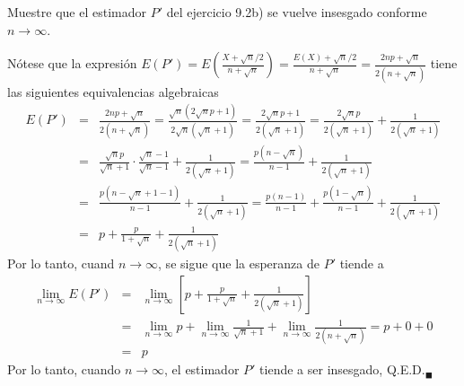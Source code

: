 \begin{enunciado}
 Muestre que el estimador $P'$ del ejercicio 9.2b) se vuelve insesgado conforme $n \rightarrow \infty$.
\end{enunciado}

\begin{solucion}
 N\'otese que la expresi\'on $E\left(P'\right) = E\left( \frac{X+\sqrt{n}/2}{n+\sqrt{n}} \right) = \frac{E(X)+\sqrt{n}/2}{n+\sqrt{n}} =\frac{2np + \sqrt{n}}{2\left( n + \sqrt{n} \right)}$ tiene las siguientes equivalencias algebraicas
 \begin{eqnarray*}
  E\left(P'\right) & = & \frac{2np + \sqrt{n}}{2\left( n + \sqrt{n} \right)} = \frac{\sqrt{n} \left( 2\sqrt{n}p + 1\right)}{2\sqrt{n}\left( \sqrt{n} + 1 \right)} = \frac{2\sqrt{n}p + 1}{2\left( \sqrt{n} + 1 \right)} = \frac{2\sqrt{n}p}{2\left( \sqrt{n} + 1 \right)} + \frac{1}{2\left( \sqrt{n} + 1 \right)} \\
     & = & \frac{\sqrt{n}p}{\sqrt{n}+1}\cdot \frac{\sqrt{n}-1}{\sqrt{n}-1} + \frac{1}{2\left( \sqrt{n} + 1 \right)} = \frac{p\left( n - \sqrt{n} \right)}{n-1} + \frac{1}{2\left( \sqrt{n} + 1 \right)} \\
     & = & \frac{p\left( n - \sqrt{n} + 1 - 1 \right)}{n-1} + \frac{1}{2\left( \sqrt{n} + 1 \right)} = \frac{p(n-1)}{n-1} + \frac{p\left( 1-\sqrt{n} \right)}{n-1} + \frac{1}{2\left( \sqrt{n} + 1 \right)} \\
     & = & p + \frac{p}{1 + \sqrt{n}} + \frac{1}{2\left( \sqrt{n} + 1 \right)}
 \end{eqnarray*}
 Por lo tanto, cuand $n \to \infty$, se sigue que la esperanza de $P'$ tiende a
 \begin{eqnarray*}
  \lim_{n \to \infty} E\left( P' \right) & = & \lim_{n \to \infty} \left[ p + \frac{p}{1 + \sqrt{n}} + \frac{1}{2\left( \sqrt{n} + 1 \right)} \right] \\ 
    & = & \lim_{n \to \infty} p + \lim_{n\to\infty} \frac{1}{\sqrt{n}+1} + \lim_{n \to \infty} \frac{1}{2\left(n + \sqrt{n}\right)} = p + 0 + 0 \\
    & = & p
 \end{eqnarray*}
 Por lo tanto, cuando $n \to \infty$, el estimador $P'$ tiende a ser insesgado, Q.E.D.${}_{\blacksquare}$
\end{solucion}

